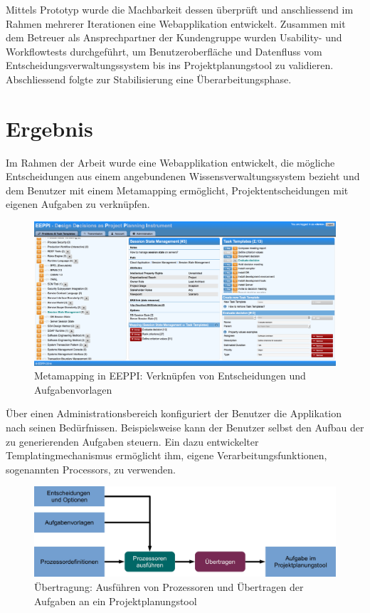 	Mittels Prototyp wurde die Machbarkeit dessen überprüft
	und anschliessend im Rahmen mehrerer Iterationen eine Webapplikation entwickelt.
	Zusammen mit dem Betreuer als Ansprechpartner der Kundengruppe wurden Usability- und Workflowtests durchgeführt, um Benutzeroberfläche
	und Datenfluss vom Entscheidungsverwaltungssystem bis ins Projektplanungstool zu validieren.
	Abschliessend folgte zur Stabilisierung eine Überarbeitungsphase.
	
	
	\section*{Ergebnis}
		
	Im Rahmen der Arbeit wurde eine Webapplikation entwickelt, 
	die mögliche Entscheidungen aus einem angebundenen Wissensverwaltungssystem bezieht
	und dem Benutzer mit einem Metamapping ermöglicht,
	Projektentscheidungen mit eigenen Aufgaben zu verknüpfen.	
	
	\begin{figure}[H]
		\includegraphics[width=\textwidth]{introduction/img/eeppiDecisionsAndTaskTemplates.png}
		\centering
		\caption{Metamapping in EEPPI: Verknüpfen von Entscheidungen und Aufgabenvorlagen}
		\label{fig:metamapping}
	\end{figure}	
	
	Über einen  Administrationsbereich konfiguriert der Benutzer die Applikation nach seinen Bedürfnissen.
	Beispielsweise kann der Benutzer selbst den Aufbau der zu generierenden Aufgaben steuern. 
	Ein dazu entwickelter Templatingmechanismus ermöglicht ihm, eigene Verarbeitungsfunktionen, sogenannten Processors, zu verwenden.
	
	\begin{figure}[H]
		\includegraphics[width=\textwidth]{introduction/img/simpleProcessWorkflow.jpg}
		\centering
		\caption{Übertragung: Ausführen von Prozessoren und Übertragen der Aufgaben an ein Projektplanungstool}
		\label{fig:metamapping}
	\end{figure}
	
